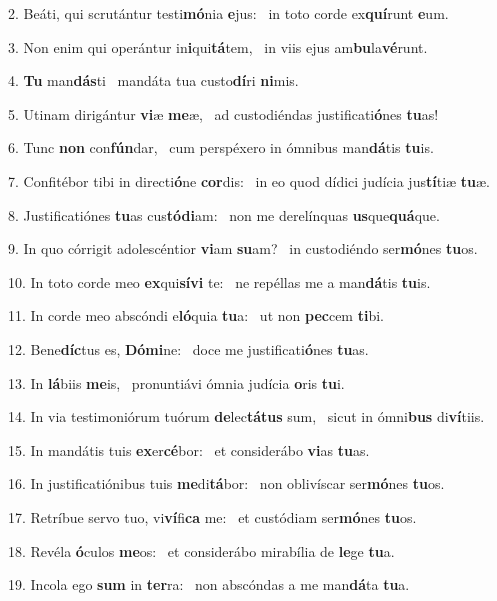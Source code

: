 2. Beáti, qui scrutántur testi\textbf{mó}nia \textbf{e}jus: \ast\  in toto corde ex\textbf{quí}runt \textbf{e}um.\

3. Non enim qui operántur in\textbf{i}qui\textbf{tá}tem, \ast\  in viis ejus am\textbf{bu}la\textbf{vé}runt.\

4. \textbf{Tu} man\textbf{dás}ti \ast\  mandáta tua custo\textbf{dí}ri \textbf{ni}mis.\

5. Utinam dirigántur \textbf{vi}æ \textbf{me}æ, \ast\  ad custodiéndas justificati\textbf{ó}nes \textbf{tu}as!\

6. Tunc \textbf{non} con\textbf{fún}dar, \ast\  cum perspéxero in ómnibus man\textbf{dá}tis \textbf{tu}is.\

7. Confitébor tibi in directi\textbf{ó}ne \textbf{cor}dis: \ast\  in eo quod dídici judícia jus\textbf{tí}tiæ \textbf{tu}æ.\

8. Justificatiónes \textbf{tu}as cus\textbf{tó}\textbf{di}am: \ast\  non me derelínquas \textbf{us}que\textbf{quá}que.\

9. In quo córrigit adolescéntior \textbf{vi}am \textbf{su}am? \ast\  in custodiéndo ser\textbf{mó}nes \textbf{tu}os.\

10. In toto corde meo \textbf{ex}qui\textbf{sí}\textbf{vi} te: \ast\  ne repéllas me a man\textbf{dá}tis \textbf{tu}is.\

11. In corde meo abscóndi e\textbf{ló}quia \textbf{tu}a: \ast\  ut non \textbf{pec}cem \textbf{ti}bi.\

12. Bene\textbf{díc}tus es, \textbf{Dó}\textbf{mi}ne: \ast\  doce me justificati\textbf{ó}nes \textbf{tu}as.\

13. In \textbf{lá}biis \textbf{me}is, \ast\  pronuntiávi ómnia judícia \textbf{o}ris \textbf{tu}i.\

14. In via testimoniórum tuórum \textbf{de}lec\textbf{tá}\textbf{tus} sum, \ast\  sicut in ómni\textbf{bus} di\textbf{ví}tiis.\

15. In mandátis tuis \textbf{ex}er\textbf{cé}bor: \ast\  et considerábo \textbf{vi}as \textbf{tu}as.\

16. In justificatiónibus tuis \textbf{me}di\textbf{tá}bor: \ast\  non oblivíscar ser\textbf{mó}nes \textbf{tu}os.\

17. Retríbue servo tuo, vi\textbf{ví}fi\textbf{ca} me: \ast\  et custódiam ser\textbf{mó}nes \textbf{tu}os.\

18. Revéla \textbf{ó}culos \textbf{me}os: \ast\  et considerábo mirabília de \textbf{le}ge \textbf{tu}a.\

19. Incola ego \textbf{sum} in \textbf{ter}ra: \ast\  non abscóndas a me man\textbf{dá}ta \textbf{tu}a.\

